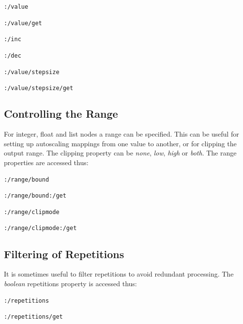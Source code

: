 \documentclass{NIME-alternate}
\begin{document}
\texttt{:/value}

\texttt{:/value/get}

\texttt{:/inc}

\texttt{:/dec} 

\texttt{:/value/stepsize}

\texttt{:/value/stepsize/get}





\subsection{Controlling the Range} %
\label{sub:range}

For integer, float and list nodes a range can be specified. This can be useful for setting up autoscaling mappings from one value to another, or for clipping the output range. The clipping property can be \emph{none}, \emph{low}, \emph{high} or \emph{both}. The range properties are accessed thus:

\texttt{:/range/bound}

\texttt{:/range/bound:/get}

\texttt{:/range/clipmode}

\texttt{:/range/clipmode:/get}





\subsection{Filtering of Repetitions} %
\label{sub:filtering_of_repetitions}

It is sometimes useful to filter repetitions to avoid redundant processing. The \emph{boolean} repetitions property is accessed thus:

\texttt{:/repetitions}

\texttt{:/repetitions/get}

\end{document}
